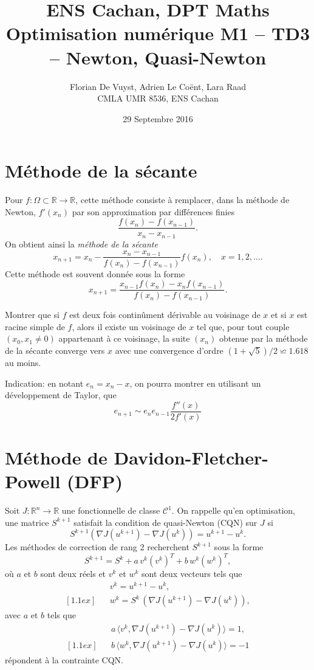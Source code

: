 \documentclass[11pt, a4paper]{article}
\title{ENS Cachan, DPT Maths \\ [1cm]
Optimisation numérique M1 -- TD3 -- Newton, Quasi-Newton}
\date{29 Septembre 2016}
\author{Florian De Vuyst, Adrien Le Coënt, Lara Raad \\ CMLA UMR 8536, ENS Cachan}
\newcommand{\Mq}{Montrer que }
\begin{document}
%
\maketitle
%

\section{Méthode de la sécante}

Pour $f:\Omega \subset \mathbb{R} \rightarrow \mathbb{R}$,
cette méthode consiste à remplacer, dans la méthode de Newton, $f'(x_n)$ par son approximation
par différences finies
\[
\dfrac{f(x_n) - f(x_{n-1})}{x_n - x_{n-1}}.
\]
On obtient ainsi la {\textit{méthode de la sécante}}
\[
x_{n+1} = x_{n} - \dfrac{x_n - x_{n-1}}{f(x_n) - f(x_{n-1})}f(x_n), \quad x=1,2,\dots.
\]
Cette méthode est souvent donnée sous la forme
\[
x_{n+1} = \dfrac{x_{n-1}f(x_n) - x_nf(x_{n-1})}{f(x_n) - f(x_{n-1})}.
\]

\Mq si $f$ est deux fois continûment dérivable au voisinage de $x$ et si $x$ est racine simple de $f$, 
alors il existe un voisinage de $x$ tel que, pour tout couple $(x_0,x_1 \neq 0)$ appartenant à ce voisinage,
la suite $(x_n)$ obtenue par la méthode de la sécante converge vers $x$ avec une convergence
d'ordre $(1+\sqrt{5})/2 \backsimeq 1.618$ au moins.

Indication: en notant $e_n = x_n-x $, on pourra montrer en utilisant un développement de Taylor, que
\[
 e_{n+1} \sim e_n e_{n-1}\frac{f''(x)}{2f'(x)}
\]


\medskip
\section{Méthode de Davidon-Fletcher-Powell (DFP)}

Soit $J:\mathbb{R}^n\rightarrow \mathbb{R}$ une fonctionnelle de classe $\mathscr{C}^1$.
On rappelle qu'en optimisation, une matrice $S^{k+1}$ satisfait la condition
de quasi-Newton (CQN) sur $J$ si
\[
S^{k+1} \left(\nabla J(u^{k+1})-\nabla J(u^k)\right)=u^{k+1}-u^k.
\] 
Les méthodes de correction de rang 2 recherchent $S^{k+1}$ sous la forme
\[
S^{k+1} = S^k + a\, v^k(v^k)^T + b\, w^k (w^k)^T, 
\]
où $a$ et $b$ sont deux réels et $v^k$ et $w^k$ sont deux vecteurs tels que
%
\begin{eqnarray*}
&& v^k = u^{k+1} - u^k, \\ [1.1ex]
&& w^k = S^k \, \left(\nabla J(u^{k+1})-\nabla J(u^k)\right),
\end{eqnarray*}
%
avec $a$ et $b$ tels que
%
\begin{eqnarray*}
&& a\, \langle v^k, \nabla J(u^{k+1})-\nabla J(u^k) \rangle = 1,\\ [1.1ex]
&& b\, \langle w^k, \nabla J(u^{k+1})-\nabla J(u^k) \rangle = -1
\end{eqnarray*}
%
répondent à la contrainte CQN.
%
\end{document}
